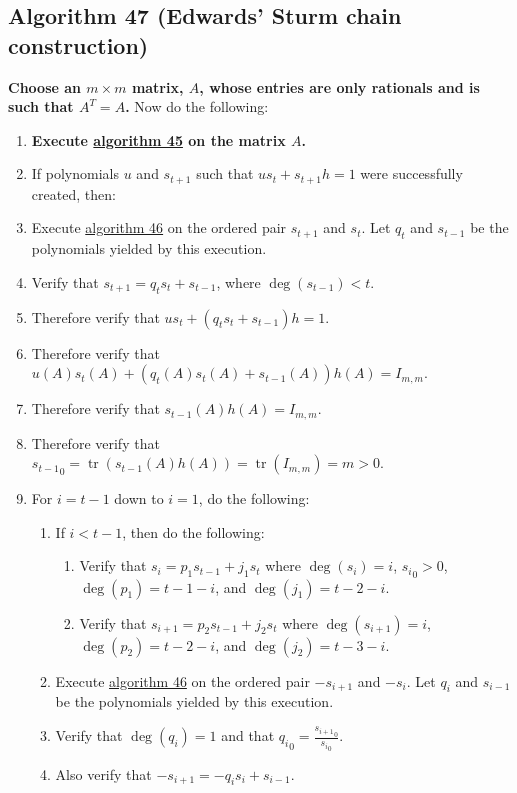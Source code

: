 \documentclass[twocolumn]{article}
\DeclareMathOperator{\tr}{tr}
\begin{document}
		\subsection{Algorithm 47 (Edwards' Sturm chain construction)}\label{sec:algorithm 47}
			\textbf{Choose an $m\times m$ matrix, $A$, whose entries are only rationals and is such that $A^T=A$.} Now do the following:
			\begin{enumerate}
				\item \textbf{Execute \hyperref[sec:algorithm 45]{algorithm 45} on the matrix $A$.}
				\item If polynomials $u$ and $s_{t+1}$ such that $us_t+s_{t+1}h=1$ were successfully created, then:
				\item Execute \hyperref[sec:algorithm 46]{algorithm 46} on the ordered pair $s_{t+1}$ and $s_t$. Let $q_t$ and $s_{t-1}$ be the polynomials yielded by this execution.
				\item Verify that $s_{t+1}=q_ts_t+s_{t-1}$, where $\deg(s_{t-1})<t$.
				\item Therefore verify that $us_t+(q_ts_t+s_{t-1})h=1$.
				\item Therefore verify that $u(A)s_t(A)+(q_t(A)s_t(A)+s_{t-1}(A))h(A)=I_{m,m}$.
				\item Therefore verify that $s_{t-1}(A)h(A)=I_{m,m}$.
				\item Therefore verify that ${s_{t-1}}_0=\tr(s_{t-1}(A)h(A))=\tr(I_{m,m})=m>0$.
				\item For $i=t-1$ down to $i=1$, do the following:
				\begin{enumerate}
					\item If $i<t-1$, then do the following:
					\begin{enumerate}
						\item Verify that $s_i=p_1s_{t-1}+j_1s_t$ where $\deg(s_i)=i$, ${s_i}_0>0$, $\deg(p_1)=t-1-i$, and $\deg(j_1)=t-2-i$.
						\item Verify that $s_{i+1}=p_2s_{t-1}+j_2s_t$ where $\deg(s_{i+1})=i$, $\deg(p_2)=t-2-i$, and $\deg(j_2)=t-3-i$.
					\end{enumerate}
					\item Execute \hyperref[sec:algorithm 46]{algorithm 46} on the ordered pair $-s_{i+1}$ and $-s_i$. Let $q_i$ and $s_{i-1}$ be the polynomials yielded by this execution.
					\item Verify that $\deg(q_i)=1$ and that ${q_i}_0=\frac{{s_{i+1}}_0}{{s_i}_0}$.
					\item Also verify that $-s_{i+1}=-q_is_i+s_{i-1}$.

\end{enumerate}
\end{enumerate}
\end{document}
